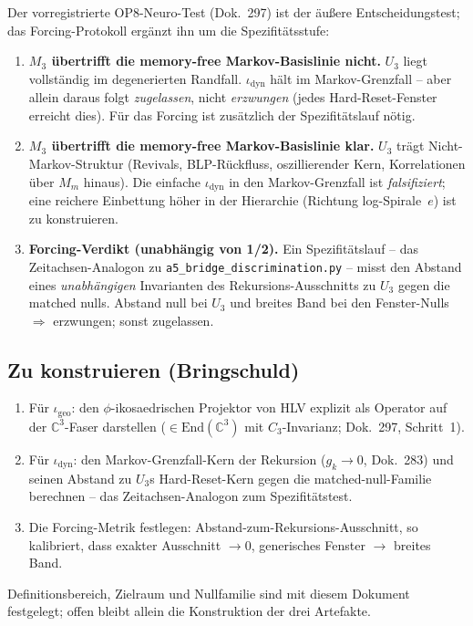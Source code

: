 Der vorregistrierte OP8-Neuro-Test (Dok.~297) ist der äußere
Entscheidungstest; das Forcing-Protokoll ergänzt ihn um die
Spezifitätsstufe:
\begin{enumerate}
  \item \textbf{$M_3$ übertrifft die memory-free Markov-Basislinie nicht.}
    $U_3$ liegt vollständig im degenerierten Randfall. $\iota_{\text{dyn}}$
    hält im Markov-Grenzfall -- aber allein daraus folgt \emph{zugelassen},
    nicht \emph{erzwungen} (jedes Hard-Reset-Fenster erreicht dies). Für das
    Forcing ist zusätzlich der Spezifitätslauf nötig.
  \item \textbf{$M_3$ übertrifft die memory-free Markov-Basislinie klar.}
    $U_3$ trägt Nicht-Markov-Struktur (Revivals, BLP-Rückfluss,
    oszillierender Kern, Korrelationen über $M_m$ hinaus). Die einfache
    $\iota_{\text{dyn}}$ in den Markov-Grenzfall ist \emph{falsifiziert};
    eine reichere Einbettung höher in der Hierarchie (Richtung
    log-Spirale~$e$) ist zu konstruieren.
  \item \textbf{Forcing-Verdikt (unabhängig von 1/2).} Ein
    Spezifitätslauf -- das Zeitachsen-Analogon zu
    \texttt{a5\_bridge\_discrimination.py} -- misst den Abstand eines
    \emph{unabhängigen} Invarianten des Rekursions-Ausschnitts zu $U_3$
    gegen die matched nulls. Abstand null bei $U_3$ und breites Band bei den
    Fenster-Nulls $\Rightarrow$ erzwungen; sonst zugelassen.
\end{enumerate}

\subsection*{Zu konstruieren (Bringschuld)}

\begin{enumerate}
  \item Für $\iota_{\text{geo}}$: den $\phi$-ikosaedrischen Projektor von
    HLV explizit als Operator auf der $\mathbb{C}^3$-Faser darstellen
    ($\in \mathrm{End}(\mathbb{C}^3)$ mit $C_3$-Invarianz; Dok.~297,
    Schritt~1).
  \item Für $\iota_{\text{dyn}}$: den Markov-Grenzfall-Kern der Rekursion
    ($g_k\to 0$, Dok.~283) und seinen Abstand zu $U_3$s Hard-Reset-Kern
    gegen die matched-null-Familie berechnen -- das Zeitachsen-Analogon zum
    Spezifitätstest.
  \item Die Forcing-Metrik festlegen: Abstand-zum-Rekursions-Ausschnitt, so
    kalibriert, dass exakter Ausschnitt $\to 0$, generisches Fenster
    $\to$ breites Band.
\end{enumerate}
Definitionsbereich, Zielraum und Nullfamilie sind mit diesem Dokument
festgelegt; offen bleibt allein die Konstruktion der drei Artefakte.

